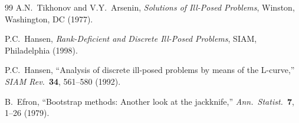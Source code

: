 \documentclass[12pt]{article}
\begin{document}
\begin{thebibliography}{99}
A.N.~Tikhonov and V.Y.~Arsenin,
\textit{Solutions of Ill-Posed Problems},
Winston, Washington, DC (1977).

P.C.~Hansen,
\textit{Rank-Deficient and Discrete Ill-Posed Problems},
SIAM, Philadelphia (1998).

P.C.~Hansen,
``Analysis of discrete ill-posed problems by means of the L-curve,''
\textit{SIAM Rev.}\ \textbf{34}, 561--580 (1992).

B.~Efron,
``Bootstrap methods: Another look at the jackknife,''
\textit{Ann.\ Statist.}\ \textbf{7}, 1--26 (1979).

\end{thebibliography}
\end{document}
